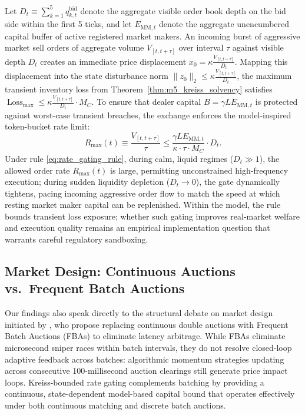 \documentclass[12pt]{article}
\theoremstyle{definition}
\theoremstyle{remark}
\begin{document}
Let $D_t \equiv \sum_{k=1}^5 q_{k,t}^{\text{bid}}$ denote the aggregate visible order book depth on the bid side within the first 5 ticks, and let $E_{\text{MM}, t}$ denote the aggregate unencumbered capital buffer of active registered market makers. An incoming burst of aggressive market sell orders of aggregate volume $V_{[t, t+\tau]}$ over interval $\tau$ against visible depth $D_t$ creates an immediate price displacement $x_0 = \kappa \frac{V_{[t, t+\tau]}}{D_t}$. Mapping this displacement into the state disturbance norm $\|z_0\|_2 \le \kappa \frac{V_{[t, t+\tau]}}{D_t}$, the maximum transient inventory loss from Theorem~\ref{thm:m5_kreiss_solvency} satisfies $\operatorname{Loss}_{\max} \le \kappa \frac{V_{[t, t+\tau]}}{D_t} \cdot M_C$. To ensure that dealer capital $B = \gamma L E_{\text{MM}, t}$ is protected against worst-case transient breaches, the exchange enforces the model-inspired token-bucket rate limit:
\begin{equation}
R_{\max}(t) \equiv \frac{V_{[t, t+\tau]}}{\tau} \le \frac{\gamma L E_{\text{MM}, t}}{\kappa \cdot \tau \cdot M_C} \cdot D_t.
\label{eq:rate_gating_rule}
\end{equation}
Under rule \eqref{eq:rate_gating_rule}, during calm, liquid regimes ($D_t \gg 1$), the allowed order rate $R_{\max}(t)$ is large, permitting unconstrained high-frequency execution; during sudden liquidity depletion ($D_t \to 0$), the gate dynamically tightens, pacing incoming aggressive order flow to match the speed at which resting market maker capital can be replenished. Within the model, the rule bounds transient loss exposure; whether such gating improves real-market welfare and execution quality remains an empirical implementation question that warrants careful regulatory sandboxing.

\subsection{Market Design: Continuous Auctions vs.\ Frequent Batch Auctions}
Our findings also speak directly to the structural debate on market design initiated by \citet{budish2015}, who propose replacing continuous double auctions with Frequent Batch Auctions (FBAs) to eliminate latency arbitrage. While FBAs eliminate microsecond sniper races within batch intervals, they do not resolve closed-loop adaptive feedback across batches: algorithmic momentum strategies updating across consecutive 100-millisecond auction clearings still generate price impact loops. Kreiss-bounded rate gating complements batching by providing a continuous, state-dependent model-based capital bound that operates effectively under both continuous matching and discrete batch auctions.
\end{document}
